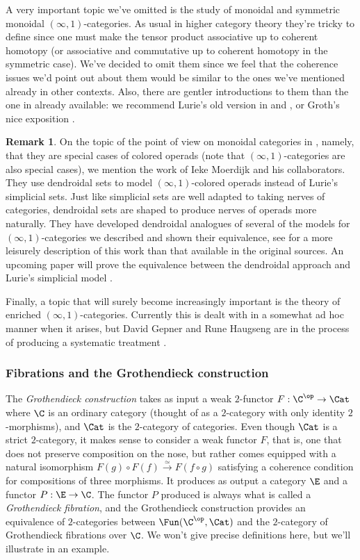 \documentclass[12pt]{amsart}
\theoremstyle{definition} \newtheorem{definition}[theorem]{Definition}
\newtheorem{remark}[theorem]{Remark}
\numberwithin{equation}{section}
\newcommand{\oo}{\infty}
\newcommand{\io}{$(\oo,1)$}
\begin{document}
A very important topic we've omitted is the study of monoidal and
symmetric monoidal \io-categories. As usual in higher category theory
they're tricky to define since one must make the tensor product
associative up to coherent homotopy (or associative and commutative up
to coherent homotopy in the symmetric case). We've decided to omit
them since we feel that the coherence issues we'd point out about them
would be similar to the ones we've mentioned already in other
contexts. Also, there are gentler introductions to them than the one
in \cite{HA} already available: we recommend Lurie's old version in
\cite{DAG2} and \cite{DAG3}, or Groth's nice exposition \cite[Sections
3 and 4]{Groth}.

\begin{remark}
  On the topic of the point of view on monoidal categories in
  \cite{HA}, namely, that they are special cases of colored operads
  (note that \io-categories are also special cases), we mention the
  work of Ieke Moerdijk and his collaborators. They use dendroidal
  sets to model \io-colored operads instead of Lurie's simplicial
  sets. Just like simplicial sets are well adapted to taking nerves of
  categories, dendroidal sets are shaped to produce nerves of operads
  more naturally. They have developed dendroidal analogues of several
  of the models for $(\oo,1)$-categories we described and shown their
  equivalence, see \cite{Ieke} for a more leisurely description of this
  work than that available in the original sources.
  An upcoming paper will prove the equivalence between the dendroidal
  approach and Lurie's simplicial model \cite{Gijs}.
\end{remark}

Finally, a topic that will surely become increasingly important is the
theory of enriched \io-categories. Currently this is dealt with in a
somewhat ad hoc manner when it arises, but David Gepner and Rune
Haugseng are in the process of producing a systematic treatment
\cite{Rune}.


\subsubsection{Fibrations and the Grothendieck construction}

The \emph{Grothendieck construction} takes as input a weak $2$-functor
$F : \C^{\op} \to \Cat$ where $\C$ is an ordinary category (thought of
as a $2$-category with only identity $2$-morphisms), and $\Cat$  is
the $2$-category of categories. Even though $\Cat$ is a strict
$2$-category, it makes sense to consider a weak functor $F$, that is,
one that does not preserve composition on the nose, but rather comes
equipped with a natural isomorphism $F(g) \circ F(f)
\xrightarrow{\simeq} F(f \circ g)$ satisfying a coherence condition
for compositions of three morphisms. It produces as output a category
$\E$ and a functor $P : \E \to \C$. The functor $P$ produced is always
what is called a \emph{Grothendieck fibration}, and the Grothendieck
construction provides an equivalence of $2$-categories between
$\Fun(\C^{\op}, \Cat)$ and the $2$-category of Grothendieck fibrations
over $\C$. We won't give precise definitions here, but we'll
illustrate in an example.
\end{document}
